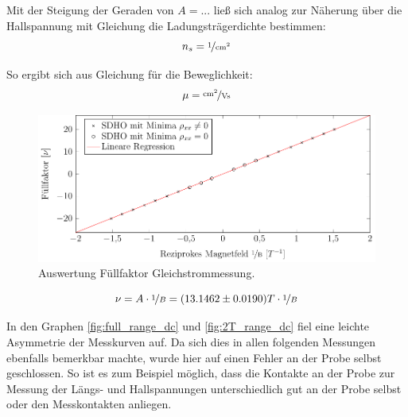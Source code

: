 Mit der Steigung der Geraden von $A=...$  %
ließ sich analog zur Näherung über die Hallspannung mit Gleichung %
die Ladungsträgerdichte bestimmen:
\begin{equation}
n_s= \unitfrac{1}{cm^2}   %
\end{equation}

So ergibt sich aus Gleichung %
für die Beweglichkeit:
\begin{equation}
\mu= \unitfrac{cm^2}{Vs}   %
\end{equation}
 

\begin{figure}[h]
	\centering
	\includegraphics{graphs/dc/auswertung.pdf}
	\caption[Auswertung Füllfaktor Gleichstrommessung]{
		Auswertung Füllfaktor Gleichstrommessung.
	}
	\label{fig:dc_sdho_ausw}
\end{figure}

\begin{equation}
\nu= A\cdot \nicefrac{1}{B}=(13.1462 \pm 0.0190)T \cdot \nicefrac{1}{B}
\end{equation}

In den Graphen \ref{fig:full_range_dc} und \ref{fig:2T_range_dc} fiel eine leichte Asymmetrie der Messkurven auf. Da sich dies in allen folgenden Messungen ebenfalls bemerkbar machte, wurde hier auf einen Fehler an der Probe selbst geschlossen. So ist es zum Beispiel möglich, dass die Kontakte an der Probe zur Messung der Längs- und Hallspannungen unterschiedlich gut an der Probe selbst oder den Messkontakten anliegen. 